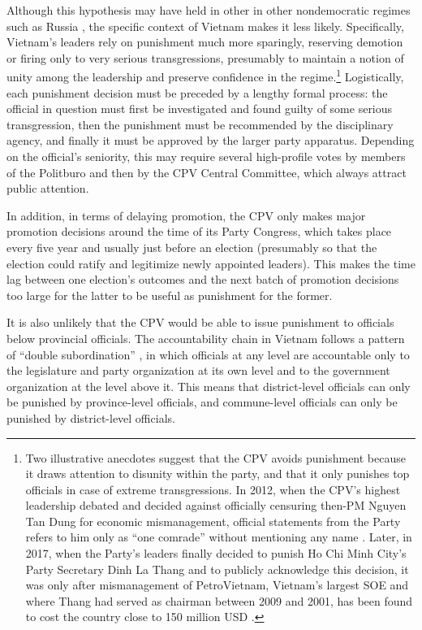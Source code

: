\documentclass[12pt]{article}
\newcommand\fnote[1]{\footnote{\baselineskip=2\normalbaselineskip#1}}
\newcommand{\1}{\mathbbm{1}}
\begin{document}
Although this hypothesis may have held in other in other nondemocratic regimes such as Russia \citep{Myagkov2009}, the specific context of Vietnam makes it less likely. Specifically, Vietnam's leaders rely on punishment much more sparingly, reserving demotion or firing only to very serious transgressions, presumably to maintain a notion of unity among the leadership and preserve confidence in the regime.\fnote{Two illustrative anecdotes suggest that the CPV avoids punishment because it draws attention to disunity within the party, and that it only punishes top officials in case of extreme transgressions. In 2012, when the CPV's highest leadership debated and decided against officially censuring then-PM Nguyen Tan Dung for economic mismanagement, official statements from the Party refers to him only as ``one comrade'' without mentioning any name \citep{voa2012}. Later, in 2017, when the Party's leaders finally decided to punish Ho Chi Minh City's Party Secretary Dinh La Thang and to publicly acknowledge this decision, it was only after mismanagement of PetroVietnam, Vietnam's largest SOE and where Thang had served as chairman between 2009 and 2001, has been found to cost the country close to 150 million USD \citep{BBC2017}.} Logistically, each punishment decision must be preceded by a lengthy formal process: the official in question must first be investigated and found guilty of some serious transgression, then the punishment must be recommended by the disciplinary agency, and finally it must be approved by the larger party apparatus. Depending on the official's seniority, this may require several high-profile votes by members of the Politburo and then by the CPV Central Committee, which always attract public attention.

In addition, in terms of delaying promotion, the CPV only makes major promotion decisions around the time of its Party Congress, which takes place every five year and usually just before an election (presumably so that the election could ratify and legitimize newly appointed leaders). This makes the time lag between one election's outcomes and the next batch of promotion decisions too large for the latter to be useful as punishment for the former.

It is also unlikely that the CPV would be able to issue punishment to officials below provincial officials. The accountability chain in Vietnam follows a pattern of ``double subordination'' \citep[][pg. 8]{Kerkvliet2004}, in which officials at any level are accountable only to the legislature and party organization at its own level and to the government organization at the level above it. This means that district-level officials can only be punished by province-level officials, and commune-level officials can only be punished by district-level officials. 
\end{document}
